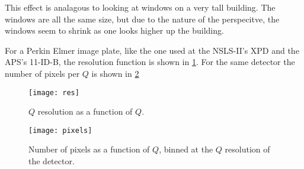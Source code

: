 This effect is analagous to looking at windows on a very tall building.
The windows are all the same size, but due to the nature of the perspecitve, the windows seem to shrink as one looks higher up the building.


For a Perkin Elmer image plate, like the one used at the NSLS-II's XPD and the APS's 11-ID-B, the resolution function is shown in \ref{fig:res_func}.
For the same detector the number of pixels per $Q$ is shown in \ref{fig:pixel_hist}
\begin{figure}[!ht]
  \texttt{[image: res]}
\caption{$Q$ resolution as a function of $Q$.}
\label{fig:res_func}
\end{figure}

\begin{figure}[!ht]
  \texttt{[image: pixels]}
\caption{Number of pixels as a function of $Q$, binned at the $Q$ resolution of the detector.}
\label{fig:pixel_hist}
\end{figure}